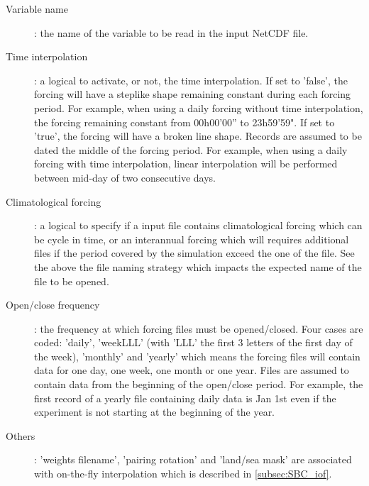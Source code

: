 \documentclass[../tex_main/NEMO_manual]{subfiles}
\begin{document}
\begin{description}
\item[Variable name]:
  the name of the variable to be read in the input NetCDF file.

\item[Time interpolation]:
  a logical to activate, or not, the time interpolation.
  If set to 'false', the forcing will have a steplike shape remaining constant during each forcing period.
  For example, when using a daily forcing without time interpolation, the forcing remaining constant from
  00h00'00'' to 23h59'59".
  If set to 'true', the forcing will have a broken line shape.
  Records are assumed to be dated the middle of the forcing period.
  For example, when using a daily forcing with time interpolation,
  linear interpolation will be performed between mid-day of two consecutive days. 

\item[Climatological forcing]:
  a logical to specify if a input file contains climatological forcing which can be cycle in time,
  or an interannual forcing which will requires additional files if
  the period covered by the simulation exceed the one of the file.
  See the above the file naming strategy which impacts the expected name of the file to be opened. 

\item[Open/close frequency]:
  the frequency at which forcing files must be opened/closed.
  Four cases are coded:
  'daily', 'weekLLL' (with 'LLL' the first 3 letters of the first day of the week), 'monthly' and 'yearly' which
  means the forcing files will contain data for one day, one week, one month or one year.
  Files are assumed to contain data from the beginning of the open/close period.
  For example, the first record of a yearly file containing daily data is Jan 1st even if
  the experiment is not starting at the beginning of the year. 

\item[Others]:
  'weights filename', 'pairing rotation' and 'land/sea mask' are associated with
  on-the-fly interpolation which is described in \autoref{subsec:SBC_iof}.

\end{description}
\end{document}
